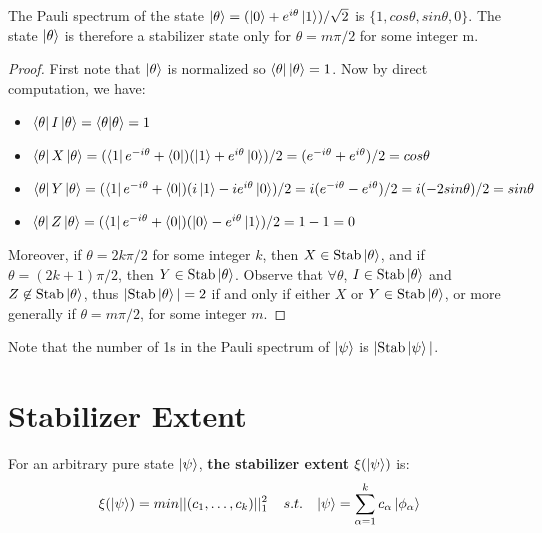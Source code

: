 \documentclass[12pt]{dalthesis}
\begin{document}
\begin{proposition}
The Pauli spectrum of the state $\ket{\theta} = (\ket{0} + e^{i\theta}\ket{1})/\sqrt{2}$ is $\{1, cos\theta, sin\theta, 0\}$. The state $\ket{\theta}$ is therefore a stabilizer state only for $\theta = m \pi/2$ for some integer m.
\end{proposition}
\begin{proof}
First note that $\ket{\theta}$ is normalized so $\bra{\theta}\ket{\theta} = 1$. Now by direct computation, we have:
\begin{itemize}
\item $\bra{\theta}I\ket{\theta} = \braket{\theta|\theta} = 1$
\item $\bra{\theta}X\ket{\theta} = (\bra{1}e^{-i\theta} + \bra{0})(\ket{1} + e^{i\theta}\ket{0})/2 = (e^{-i\theta} + e^{i\theta})/2 = cos\theta$
\item $\bra{\theta}Y\ket{\theta} = (\bra{1}e^{-i\theta} + \bra{0})(i\ket{1} - ie^{i\theta}\ket{0})/2 = i(e^{-i\theta} - e^{i\theta})/2 = i(-2sin\theta)/2 = sin\theta$
\item $\bra{\theta}Z\ket{\theta} = (\bra{1}e^{-i\theta} + \bra{0})(\ket{0} - e^{i\theta}\ket{1})/2 = 1 - 1 = 0$
\end{itemize} 
Moreover, if $\theta = 2k\pi /2$ for some integer $k$, then $X \in \text{Stab}\ket{\theta}$, and if $\theta = (2k+1)\pi /2$, then $Y \in \text{Stab}\ket{\theta}$. Observe that $\forall \theta$, $I \in \text{Stab}\ket{\theta}$ and $Z \not\in \text{Stab}\ket{\theta}$, thus $|\text{Stab}\ket{\theta}| = 2$ if and only if either $X$ or $Y \in \text{Stab}\ket{\theta}$, or more generally if $\theta = m \pi /2$, for some integer $m$.
\end{proof}
Note that the number of 1s in the Pauli spectrum of $\ket{\psi}$ is $|\text{Stab}\ket{\psi}|$.

\section{Stabilizer Extent}
\begin{definition}
For an arbitrary pure state $\ket{\psi}$, \textbf{the stabilizer extent} $\xi (\ket{\psi})$ is:
\begin{equation}
\xi (\ket{\psi}) = min||(c_1, \dots , c_k)||_1^2 \hspace{4mm} s.t. \hspace{3mm} \ket{\psi} = \sum_{\alpha = 1}^k c_{\alpha} \ket{\phi_{\alpha}}
\end{equation}
\end{definition}
\end{document}
